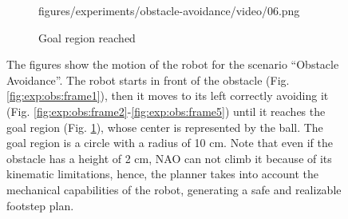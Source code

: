 \begin{figure}
\begin{subfigure}{0.48\textwidth}
      {figures/experiments/obstacle-avoidance/video/06.png}
    \caption{Goal region reached}
    \label{fig:exp:obs:frame6}
  \end{subfigure}
  \caption{The figures show the motion of the robot for the scenario
      ``Obstacle Avoidance''. The robot starts in front of the obstacle
      (Fig. \ref{fig:exp:obs:frame1}), then it moves to its left correctly
      avoiding it (Fig. \ref{fig:exp:obs:frame2}-\ref{fig:exp:obs:frame5})
      until it reaches the goal region (Fig. \ref{fig:exp:obs:frame6}),
      whose center is represented by 
      the ball. The goal region is a circle with a radius of 10 cm. 
      Note that even if the obstacle has a height of 2 cm, NAO can not climb it 
      because of its kinematic limitations, hence, the planner takes
      into account the mechanical capabilities of the robot, generating a 
      safe and realizable footstep plan.}
  \label{fig:experiments:obstacle-avoidance:videoframes}
\end{figure}

